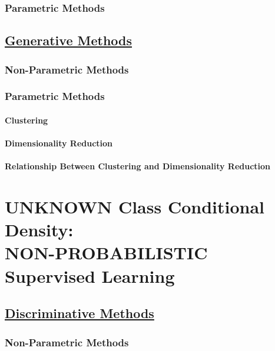 \documentclass{book}
\begin{document}
\section{Parametric Methods}
\chapter{\underline{Generative Methods}}
\section{Non-Parametric Methods}

\section{Parametric Methods}

\subsection{Clustering}

\subsection{Dimensionality Reduction}


\subsection{Relationship Between Clustering and Dimensionality Reduction}

\part{UNKNOWN Class Conditional Density:
\\NON-PROBABILISTIC Supervised Learning}

\chapter{\underline{Discriminative Methods}}
\section{Non-Parametric Methods}
\end{document}
